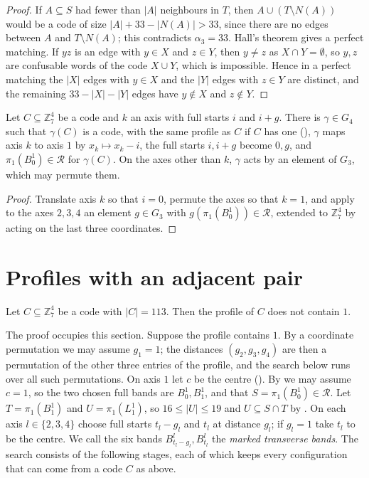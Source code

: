 \documentclass[11pt,colorlinks]{charlie}
\newcommand{\Zs}{\mathbb{Z}_7}
\newcommand{\cR}{\mathcal{R}}
\begin{document}
\begin{proof}
If $A\subseteq S$ had fewer than $|A|$ neighbours in $T$, then $A\cup(T\setminus N(A))$ would be a code of size $|A|+33-|N(A)|>33$, since there are no edges between $A$ and $T\setminus N(A)$; this contradicts $\alpha_3=33$. Hall's theorem gives a perfect matching. If $yz$ is an edge with $y\in X$ and $z\in Y$, then $y\ne z$ as $X\cap Y=\emptyset$, so $y,z$ are confusable words of the code $X\cup Y$, which is impossible. Hence in a perfect matching the $|X|$ edges with $y\in X$ and the $|Y|$ edges with $z\in Y$ are distinct, and the remaining $33-|X|-|Y|$ edges have $y\notin X$ and $z\notin Y$.
\end{proof}

\begin{lemma}[Normalisation]\label{lem:normal}
Let $C\subseteq\Zs^4$ be a code and $k$ an axis with full starts $i$ and $i+g$. There is $\gamma\in G_4$ such that $\gamma(C)$ is a code, with the same profile as $C$ if $C$ has one (), $\gamma$ maps axis $k$ to axis $1$ by $x_k\mapsto x_k-i$, the full starts $i,i+g$ become $0,g$, and $\pi_1(B^1_0)\in\cR$ for $\gamma(C)$. On the axes other than $k$, $\gamma$ acts by an element of $G_3$, which may permute them.
\end{lemma}

\begin{proof}
Translate axis $k$ so that $i=0$, permute the axes so that $k=1$, and apply to the axes $2,3,4$ an element $g\in G_3$ with $g(\pi_1(B^1_0))\in\cR$, extended to $\Zs^4$ by acting on the last three coordinates.
\end{proof}

\section{Profiles with an adjacent pair}\label{sec:adjacent}
\begin{proposition}\label{prop:adjacent}
Let $C\subseteq\Zs^4$ be a code with $|C|=113$. Then the profile of $C$ does not contain $1$.
\end{proposition}

The proof occupies this section. Suppose the profile contains $1$. By a coordinate permutation we may assume $g_1=1$; the distances $(g_2,g_3,g_4)$ are then a permutation of the other three entries of the profile, and the search below runs over all such permutations. On axis $1$ let $c$ be the centre (). By  we may assume $c=1$, so the two chosen full bands are $B^1_0,B^1_1$, and that $S=\pi_1(B^1_0)\in\cR$. Let $T=\pi_1(B^1_1)$ and $U=\pi_1(L^1_1)$, so $16\le|U|\le19$ and $U\subseteq S\cap T$ by . On each axis $l\in\{2,3,4\}$ choose full starts $t_l-g_l$ and $t_l$ at distance $g_l$; if $g_l=1$ take $t_l$ to be the centre. We call the six bands $B^l_{t_l-g_l},B^l_{t_l}$ the \emph{marked transverse bands}. The search consists of the following stages, each of which keeps every configuration that can come from a code $C$ as above.
\end{document}
